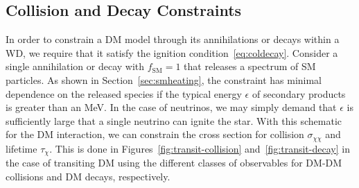 \subsection{Collision and Decay Constraints}
\label{sec:CollisionConstraints}

In order to constrain a DM model through its annihilations or decays within a WD, we require that it satisfy the ignition condition~\eqref{eq:coldecay}.
Consider a single annihilation or decay with $f_\text{SM} = 1$ that releases a spectrum of SM particles.
As shown in Section~\ref{sec:smheating}, the constraint has minimal dependence on the released species if the typical energy $\epsilon$ of secondary products is greater than an MeV.
In the case of neutrinos, we may simply demand that $\epsilon$ is sufficiently large that a single neutrino can ignite the star.
With this schematic for the DM interaction, we can constrain the cross section for collision $\sigma_{\chi \chi}$ and lifetime $\tau_\chi$.
This is done in Figures~\ref{fig:transit-collision} and~\ref{fig:transit-decay} in the case of transiting DM using the different classes of observables for DM-DM collisions and DM decays, respectively.

